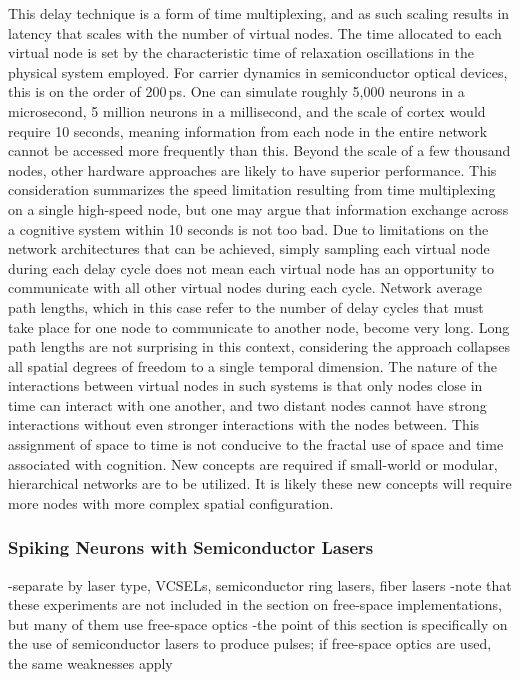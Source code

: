 This delay technique is a form of time multiplexing, and as such scaling results in latency that scales with the number of virtual nodes. The time allocated to each virtual node is set by the characteristic time of relaxation oscillations in the physical system employed. For carrier dynamics in semiconductor optical devices, this is on the order of 200\,ps. One can simulate roughly 5,000 neurons in a microsecond, 5 million neurons in a millisecond, and the scale of cortex would require 10 seconds, meaning information from each node in the entire network cannot be accessed more frequently than this. Beyond the scale of a few thousand nodes, other hardware approaches are likely to have superior performance. This consideration summarizes the speed limitation resulting from time multiplexing on a single high-speed node, but one may argue that information exchange across a cognitive system within 10 seconds is not too bad. Due to limitations on the network architectures that can be achieved, simply sampling each virtual node during each delay cycle does not mean each virtual node has an opportunity to communicate with all other virtual nodes during each cycle. Network average path lengths, which in this case refer to the number of delay cycles that must take place for one node to communicate to another node, become very long. Long path lengths are not surprising in this context, considering the approach collapses all spatial degrees of freedom to a single temporal dimension. The nature of the interactions between virtual nodes in such systems is that only nodes close in time can interact with one another, and two distant nodes cannot have strong interactions without even stronger interactions with the nodes between. This assignment of space to time is not conducive to the fractal use of space and time associated with cognition. New concepts are required if small-world or modular, hierarchical networks are to be utilized. It is likely these new concepts will require more nodes with more complex spatial configuration.

\vspace{3em}
\cite{cosc2018} 

\cite{rofi2017}

\subsubsection{Spiking Neurons with Semiconductor Lasers}
-separate by laser type, VCSELs, semiconductor ring lasers, fiber lasers
-note that these experiments are not included in the section on free-space implementations, but many of them use free-space optics
-the point of this section is specifically on the use of semiconductor lasers to produce pulses; if free-space optics are used, the same weaknesses apply

